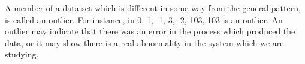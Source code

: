 A member of a data set which is different in some way from the general
pattern, is called an outlier. For instance, in {0, 1, -1, 3, -2, 103}, 103
is an outlier. An outlier may indicate that there was an error in the process
which produced the data, or it may show there is a real abnormality in the
system which we are studying.